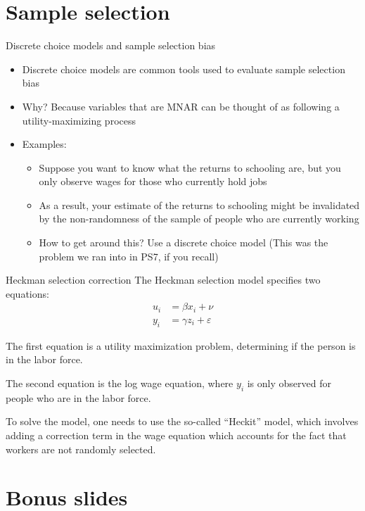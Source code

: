 \documentclass[english,aspectratio=169,12pt,xcolor=dvipsnames]{beamer}
\begin{document}
\section{Sample selection}
\begin{frame}[fragile]{Discrete choice models and sample selection bias}
\begin{itemize}
\item Discrete choice models are common tools used to evaluate sample selection bias
\item Why? Because variables that are MNAR can be thought of as following a utility-maximizing process
\item Examples:
    \begin{itemize}
    \item Suppose you want to know what the returns to schooling are, but you only observe wages for those who currently hold jobs
    \item As a result, your estimate of the returns to schooling might be invalidated by the non-randomness of the sample of people who are currently working
    \item How to get around this? Use a discrete choice model (This was the problem we ran into in PS7, if you recall)
    \end{itemize}
\end{itemize}
\end{frame}


\begin{frame}{Heckman selection correction}
The Heckman selection model specifies two equations:
\begin{align*}
u_{i}&= \beta x_{i} + \nu \\
y_{i} &= \gamma z_{i} + \varepsilon 
\end{align*}

The first equation is a utility maximization problem, determining if the person is in the labor force.


The second equation is the log wage equation, where $y_i$ is only observed for people who are in the labor force.


To solve the model, one needs to use the so-called ``Heckit'' model, which involves adding a correction term in the wage equation which accounts for the fact that workers are not randomly selected.
\end{frame}



\appendix

\section*{Bonus slides}
\end{document}
